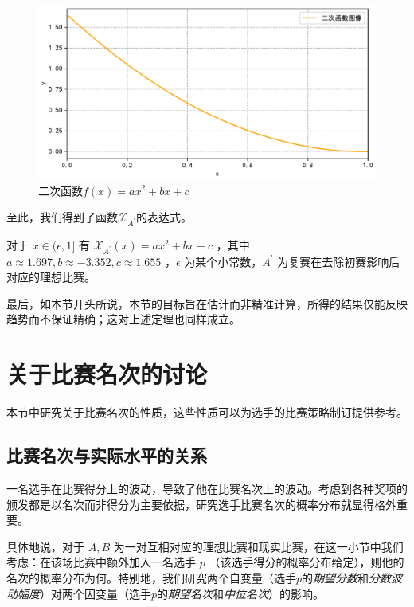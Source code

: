         \begin{figure}
            \centering
            \includegraphics[width=\textwidth]{fig/plottingQuadFuncOfXAprime.pdf}
            \caption{二次函数$f(x)=ax^2+bx+c$}
            \label{fig:quadFuncOfXAprime}
        \end{figure}

        至此，我们得到了函数$\mathcal{X}_{A^\prime}$的表达式。

        \begin{theorem}
            对于 $x\in(\epsilon,1]$ 有 $\mathcal{X}_{A^\prime}(x)=ax^2+bx+c$ ，其中 $a\approx 1.697,b\approx -3.352,c\approx 1.655$ ，$\epsilon$ 为某个小常数，$A^\prime$ 为复赛在去除初赛影响后对应的理想比赛。

            \label{thm:formulaforXAprime}
        \end{theorem}

        最后，如本节开头所说，本节的目标旨在估计而非精准计算，所得的结果仅能反映趋势而不保证精确；这对上述定理也同样成立。

\section{关于比赛名次的讨论}

    本节中研究关于比赛名次的性质，这些性质可以为选手的比赛策略制订提供参考。

    \subsection{比赛名次与实际水平的关系}

        一名选手在比赛得分上的波动，导致了他在比赛名次上的波动。考虑到各种奖项的颁发都是以名次而非得分为主要依据，研究选手比赛名次的概率分布就显得格外重要。
        
        具体地说，对于 $A,B$ 为一对互相对应的理想比赛和现实比赛，在这一小节中我们考虑：在该场比赛中额外加入一名选手 $p$ （该选手得分的概率分布给定），则他的名次的概率分布为何。特别地，我们研究两个自变量（选手$p$的\emph{期望分数}和\emph{分数波动幅度}）对两个因变量（选手$p$的\emph{期望名次}和\emph{中位名次}）的影响。

